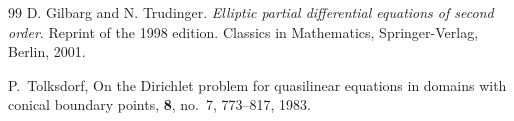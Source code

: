 \documentclass[11pt]{amsart}
\theoremstyle{definition}
\begin{document}
\begin{thebibliography}{99}
D. Gilbarg and  N. Trudinger. {\it Elliptic partial differential equations of second order}. Reprint of the 1998 edition. Classics in Mathematics,
 Springer-Verlag, Berlin, 2001.










P.~Tolksdorf,
\newblock On the Dirichlet problem for quasilinear equations in domains with conical boundary points,
 \textbf{8}, no.~7, 773--817, 1983.


\end{thebibliography}
\end{document}
